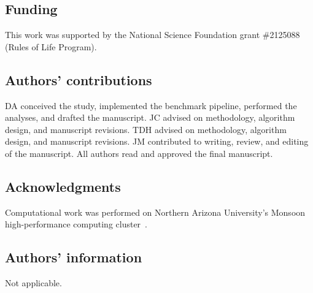 \documentclass[11pt]{article}
\begin{document}
\subsection*{Funding}
This work was supported by the National Science Foundation grant \#2125088 (Rules of Life Program).

\subsection*{Authors' contributions}
DA conceived the study, implemented the benchmark pipeline, performed the analyses, and drafted the manuscript.
JC advised on methodology, algorithm design, and manuscript revisions.
TDH advised on methodology, algorithm design, and manuscript revisions.
JM contributed to writing, review, and editing of the manuscript.
All authors read and approved the final manuscript.

\subsection*{Acknowledgments}
Computational work was performed on Northern Arizona University's Monsoon high-performance computing cluster~\citep{Buechler2025MonsoonIntro}.

\subsection*{Authors' information}
Not applicable.




\clearpage
\appendix

\end{document}
